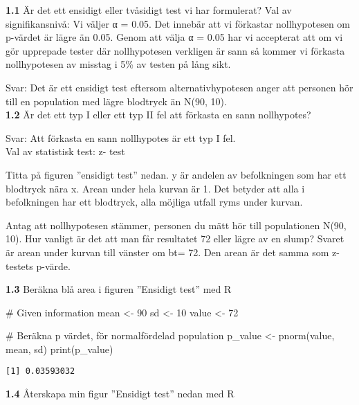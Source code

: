 \documentclass[
  letterpaper,
  DIV=11,
  numbers=noendperiod]{scrartcl}
\newenvironment{Shaded}{\begin{snugshade}}{\end{snugshade}}
\newcommand{\CommentTok}[1]{\textcolor[rgb]{0.37,0.37,0.37}{#1}}
\newcommand{\DecValTok}[1]{\textcolor[rgb]{0.68,0.00,0.00}{#1}}
\newcommand{\FunctionTok}[1]{\textcolor[rgb]{0.28,0.35,0.67}{#1}}
\newcommand{\NormalTok}[1]{\textcolor[rgb]{0.00,0.23,0.31}{#1}}
\newcommand{\OtherTok}[1]{\textcolor[rgb]{0.00,0.23,0.31}{#1}}
\begin{document}
\textbf{1.1} Är det ett ensidigt eller tvåsidigt test vi har formulerat?
Val av signifikansnivå: Vi väljer α = 0.05. Det innebär att vi förkastar
nollhypotesen om p-värdet är lägre än 0.05. Genom att välja α = 0.05 har
vi accepterat att om vi gör upprepade tester där nollhypotesen verkligen
är sann så kommer vi förkasta nollhypotesen av misstag i 5\% av testen
på lång sikt.

\hfill\break
Svar: Det är ett ensidigt test eftersom alternativhypotesen anger att
personen hör till en population med lägre blodtryck än N(90, 10).\\

\textbf{1.2} Är det ett typ I eller ett typ II fel att förkasta en sann
nollhypotes?

\hfill\break
Svar: Att förkasta en sann nollhypotes är ett typ I fel.\\

Val av statistisk test: z- test

Titta på figuren ''ensidigt test'' nedan. y är andelen av befolkningen
som har ett blodtryck nära x. Arean under hela kurvan är 1. Det betyder
att alla i befolkningen har ett blodtryck, alla möjliga utfall ryms
under kurvan.

Antag att nollhypotesen stämmer, personen du mätt hör till populationen
N(90, 10). Hur vanligt är det att man får resultatet 72 eller lägre av
en slump? Svaret är arean under kurvan till vänster om bt= 72. Den arean
är det samma som z-testets p-värde.

\textbf{1.3} Beräkna blå area i figuren ''Ensidigt test'' med R

\begin{Shaded}
\begin{Highlighting}[]
\CommentTok{\# Given information}
\NormalTok{mean }\OtherTok{\textless{}{-}} \DecValTok{90}
\NormalTok{sd }\OtherTok{\textless{}{-}} \DecValTok{10}
\NormalTok{value }\OtherTok{\textless{}{-}} \DecValTok{72}

\CommentTok{\# Beräkna p värdet, för normalfördelad population}
\NormalTok{p\_value }\OtherTok{\textless{}{-}} \FunctionTok{pnorm}\NormalTok{(value, mean, sd)}
\FunctionTok{print}\NormalTok{(p\_value)}
\end{Highlighting}
\end{Shaded}

\begin{verbatim}
[1] 0.03593032
\end{verbatim}

\textbf{1.4} Återskapa min figur ''Ensidigt test'' nedan med R
\end{document}
